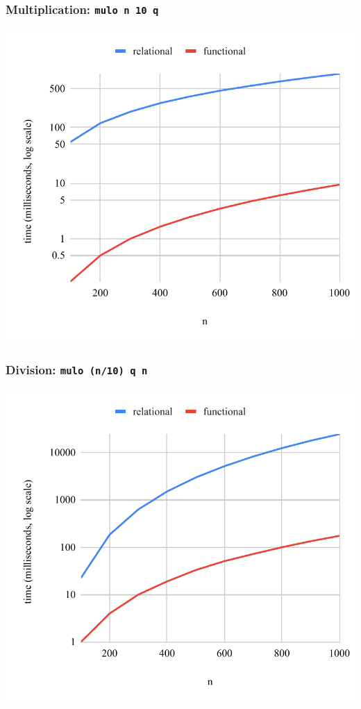 \documentclass[xcolor=table]{beamer}
\begin{document}
\begin{frame}[fragile]
  \frametitle{Multiplication: \lstinline[basicstyle=\Large]{mulo n 10 q}}
  \begin{center}
    \includegraphics[height=0.85\textheight]{figures/muloIIO.pdf}
  \end{center}
\end{frame}


\begin{frame}[fragile]
  \frametitle{Division: \lstinline[basicstyle=\Large]{mulo (n/10) q n}}
  \begin{center}
    \includegraphics[height=0.85\textheight]{figures/muloIOI.pdf}
  \end{center}
\end{frame}
\end{document}

